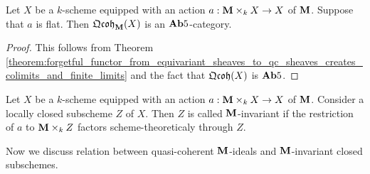 \begin{corollary}\label{corollary:for_flat_actions_equivariant_qc_sheaves_are_Ab5}
Let $X$ be a $k$-scheme equipped with an action $a:\mathbf{M}\times_kX\rightarrow X$ of $\mathbf{M}$. Suppose that $a$ is flat. Then $\mathfrak{Qcoh}_{\mathbf{M}}(X)$ is an $\mathbf{Ab}5$-category.
\end{corollary}
\begin{proof}
This follows from Theorem \ref{theorem:forgetful_functor_from_equivariant_sheaves_to_qc_sheaves_creates_colimits_and_finite_limits} and the fact that $\mathfrak{Qcoh}(X)$ is $\mathbf{Ab}5$.
\end{proof}

\begin{definition}
Let $X$ be a $k$-scheme equipped with an action $a:\mathbf{M}\times_kX\rightarrow X$ of $\mathbf{M}$. Consider a locally closed subscheme $Z$ of $X$. Then $Z$ is called $\mathbf{M}$-invariant if the restriction of $a$ to $\mathbf{M}\times_kZ$ factors scheme-theoreticaly through $Z$.
\end{definition}
\noindent
Now we discuss relation between quasi-coherent $\mathbf{M}$-ideals and $\mathbf{M}$-invariant closed subschemes.

